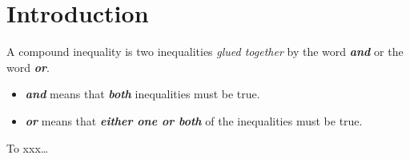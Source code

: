 

\section*{Introduction}

A compound inequality 
is two inequalities \emph{glued together} by the word {\bfseries\itshape and}
or the word {\bfseries\itshape or}.
\begin{itemize}
    \item {\bfseries\itshape and}
    means that {\bfseries\itshape both} inequalities must be true.
    \item {\bfseries\itshape or}
    means that {\bfseries\itshape either one or both} of the inequalities must be true.
\end{itemize}

\begin{myConceptSteps}{To xxx\dots}
\end{myConceptSteps}

